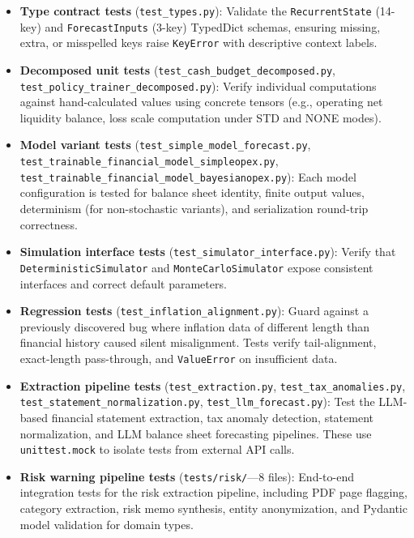 \documentclass[12pt,a4paper]{article}
\begin{document}
\begin{itemize}
  \item \textbf{Type contract tests} (\texttt{test\_types.py}):
    Validate the \texttt{RecurrentState} (14-key) and
    \texttt{ForecastInputs} (3-key) TypedDict schemas, ensuring missing,
    extra, or misspelled keys raise \texttt{KeyError} with descriptive
    context labels.

  \item \textbf{Decomposed unit tests}
    (\texttt{test\_cash\_budget\_decomposed.py},
    \texttt{test\_policy\_trainer\_decomposed.py}): Verify individual
    computations against hand-calculated values using concrete tensors
    (e.g., operating net liquidity balance, loss scale computation under
    STD and NONE modes).

  \item \textbf{Model variant tests}
    (\texttt{test\_simple\_model\_forecast.py},
    \texttt{test\_trainable\_financial\_model\_simpleopex.py},
    \texttt{test\_trainable\_financial\_model\_bayesianopex.py}):
    Each model configuration is tested for balance sheet identity,
    finite output values, determinism (for non-stochastic variants), and
    serialization round-trip correctness.

  \item \textbf{Simulation interface tests}
    (\texttt{test\_simulator\_interface.py}): Verify that
    \texttt{DeterministicSimulator} and \texttt{MonteCarloSimulator}
    expose consistent interfaces and correct default parameters.

  \item \textbf{Regression tests}
    (\texttt{test\_inflation\_alignment.py}): Guard against a previously
    discovered bug where inflation data of different length than
    financial history caused silent misalignment. Tests verify
    tail-alignment, exact-length pass-through, and \texttt{ValueError}
    on insufficient data.

  \item \textbf{Extraction pipeline tests}
    (\texttt{test\_extraction.py}, \texttt{test\_tax\_anomalies.py},
    \texttt{test\_statement\_normalization.py},
    \texttt{test\_llm\_forecast.py}): Test the LLM-based financial
    statement extraction, tax anomaly detection, statement normalization,
    and LLM balance sheet forecasting pipelines. These use
    \texttt{unittest.mock} to isolate tests from external API calls.

  \item \textbf{Risk warning pipeline tests}
    (\texttt{tests/risk/}---8 files): End-to-end integration tests for
    the risk extraction pipeline, including PDF page flagging, category
    extraction, risk memo synthesis, entity anonymization, and Pydantic
    model validation for domain types.
\end{itemize}
\end{document}
